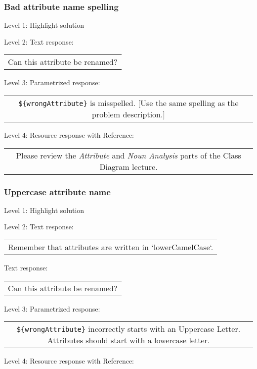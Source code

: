\subsubsection{Bad attribute name spelling}

\noindent Level 1: Highlight solution \medskip

\noindent Level 2: Text response: \medskip

\begin{tabular}{|c}
Can this attribute be renamed?
\end{tabular} \medskip

\noindent Level 3: Parametrized response: \medskip

\begin{tabular}{|c}
\verb|${wrongAttribute}| is misspelled. [Use the same spelling as the problem description.]
\end{tabular} \medskip

\noindent Level 4: Resource response with Reference:

\begin{tabular}{|c}
Please review the \textit{Attribute} and \textit{Noun Analysis} parts of the Class Diagram lecture.
\end{tabular} \medskip


\subsubsection{Uppercase attribute name}

\noindent Level 1: Highlight solution \medskip

\noindent Level 2: Text response: \medskip

\begin{tabular}{|c}
Remember that attributes are written in `lowerCamelCase`.
\end{tabular} \medskip

Text response: \medskip

\begin{tabular}{|c}
Can this attribute be renamed?
\end{tabular} \medskip

\noindent Level 3: Parametrized response: \medskip

\begin{tabular}{|c}
\verb|${wrongAttribute}| incorrectly starts with an Uppercase Letter. Attributes should start with a lowercase letter.
\end{tabular} \medskip

\noindent Level 4: Resource response with Reference:

